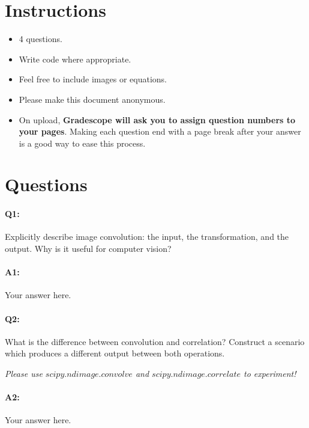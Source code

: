\section*{Instructions}
\begin{itemize}
  \item 4 questions.
  \item Write code where appropriate.
  \item Feel free to include images or equations.
  \item Please make this document anonymous.
  \item On upload, \textbf{Gradescope will ask you to assign question numbers to your pages}. Making each question end with a page break after your answer is a good way to ease this process.
\end{itemize}

\section*{Questions}

\paragraph{Q1:} Explicitly describe image convolution: the input, the transformation, and the output. Why is it useful for computer vision?

\paragraph{A1:} Your answer here.




\pagebreak
\paragraph{Q2:} What is the difference between convolution and correlation? Construct a scenario which produces a different output between both operations.

\emph{Please use \href{https://docs.scipy.org/doc/scipy/reference/generated/scipy.ndimage.convolve.html}{$scipy.ndimage.convolve$} and \href{https://docs.scipy.org/doc/scipy/reference/generated/scipy.ndimage.correlate.html}{$scipy.ndimage.correlate$} to experiment!}

\paragraph{A2:} Your answer here.




